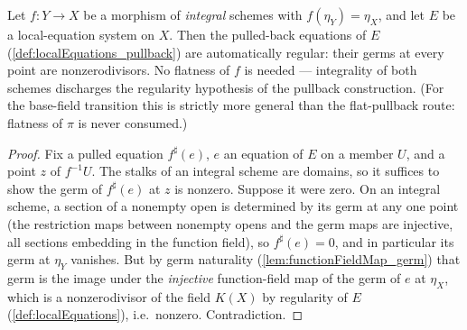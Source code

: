 \begin{lemma}
  \label{lem:pullbackEqn_regular}
  \leanok
  Let \(f : Y \to X\) be a morphism of \emph{integral} schemes with
  \(f(\eta_Y) = \eta_X\), and let \(E\) be a local-equation system on \(X\). Then the
  pulled-back equations of \(E\) (\ref{def:localEquations_pullback}) are automatically
  regular: their germs at every point are nonzerodivisors. No flatness of \(f\) is
  needed --- integrality of both schemes discharges the regularity hypothesis of the
  pullback construction. (For the base-field transition this is strictly more general
  than the flat-pullback route: flatness of \(\pi\) is never consumed.)
\end{lemma}
\begin{proof}
  \leanok
  Fix a pulled equation \(f^{\sharp}(e)\), \(e\) an equation of \(E\) on a member
  \(U\), and a point \(z\) of \(f^{-1}U\). The stalks of an integral scheme are
  domains, so it suffices to show the germ of \(f^{\sharp}(e)\) at \(z\) is nonzero.
  Suppose it were zero. On an integral scheme, a section of a nonempty open is
  determined by its germ at any one point (the restriction maps between nonempty opens
  and the germ maps are injective, all sections embedding in the function field), so
  \(f^{\sharp}(e) = 0\), and in particular its germ at \(\eta_Y\) vanishes. But by
  germ naturality (\ref{lem:functionFieldMap_germ}) that germ is the image under the
  \emph{injective} function-field map of the germ of \(e\) at \(\eta_X\), which is a
  nonzerodivisor of the field \(K(X)\) by regularity of \(E\)
  (\ref{def:localEquations}), i.e.\ nonzero. Contradiction.
\end{proof}

